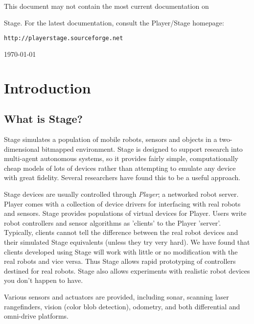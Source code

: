 \documentclass[11pt]{report}
\def\HOMEPAGE {{\tt http://playerstage.sourceforge.net}}
\begin{document}
  \centerline{This document may not contain the most current documentation on}
  \centerline{Stage.  For the latest documentation, consult the Player/Stage homepage:}
  \centerline{\HOMEPAGE}

  \vspace{4cm}

 \centerline{\today}

\tableofcontents


\setcounter{page}{0}


\chapter{Introduction}

  \section{What is Stage?}

    Stage simulates a population of mobile robots, sensors and objects
    in a two-dimensional bitmapped environment. Stage is designed to
    support research into multi-agent autonomous systems, so it
    provides fairly simple, computationally cheap models of lots of
    devices rather than attempting to emulate any device with great
    fidelity. Several researchers have found this to be a useful
    approach.

    Stage devices are usually controlled through \emph{Player}; a
    networked robot server. Player comes with a collection of device
    drivers for interfacing with real robots and sensors. Stage
    provides populations of virtual devices for Player. Users write
    robot controllers and sensor algorithms as 'clients' to the Player
    'server'. Typically, clients cannot tell the difference between
    the real robot devices and their simulated Stage equivalents
    (unless they try very hard). We have found that clients developed
    using Stage will work with little or no modification with the real
    robots and vice versa. Thus Stage allows rapid prototyping of
    controllers destined for real robots. Stage also allows
    experiments with realistic robot devices you don't happen to have.
  
    Various sensors and actuators are provided, including sonar,
    scanning laser rangefinders, vision (color blob detection),
    odometry, and both differential and omni-drive platforms.
\end{document}

